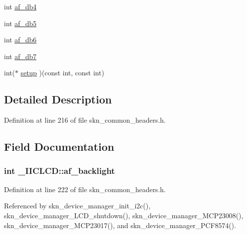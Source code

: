 \begin{DoxyCompactItemize}
\item 
int \hyperlink{struct___i_i_c_l_c_d_adbfc88b661d5da527aad6f5bcd45a85c}{af\+\_\+db4}
\item 
int \hyperlink{struct___i_i_c_l_c_d_a41c4536106493476b52c9a9df9dd8599}{af\+\_\+db5}
\item 
int \hyperlink{struct___i_i_c_l_c_d_a0f3ebbe756ecf62494733287f64821f9}{af\+\_\+db6}
\item 
int \hyperlink{struct___i_i_c_l_c_d_ae55385ca612fd157fb85e7b3d5423ee4}{af\+\_\+db7}
\item 
int($\ast$ \hyperlink{struct___i_i_c_l_c_d_ab3052517b34cbf67239b91ccbd113c00}{setup} )(const int, const int)
\end{DoxyCompactItemize}


\subsection{Detailed Description}


Definition at line 216 of file skn\+\_\+common\+\_\+headers.\+h.



\subsection{Field Documentation}
\subsubsection[{\texorpdfstring{af\+\_\+backlight}{af_backlight}}]{\setlength{\rightskip}{0pt plus 5cm}int \+\_\+\+I\+I\+C\+L\+C\+D\+::af\+\_\+backlight}\hypertarget{struct___i_i_c_l_c_d_ad160086a31276fbaf849855519b9878e}{}\label{struct___i_i_c_l_c_d_ad160086a31276fbaf849855519b9878e}


Definition at line 222 of file skn\+\_\+common\+\_\+headers.\+h.



Referenced by skn\+\_\+device\+\_\+manager\+\_\+init\+\_\+i2c(), skn\+\_\+device\+\_\+manager\+\_\+\+L\+C\+D\+\_\+shutdown(), skn\+\_\+device\+\_\+manager\+\_\+\+M\+C\+P23008(), skn\+\_\+device\+\_\+manager\+\_\+\+M\+C\+P23017(), and skn\+\_\+device\+\_\+manager\+\_\+\+P\+C\+F8574().

